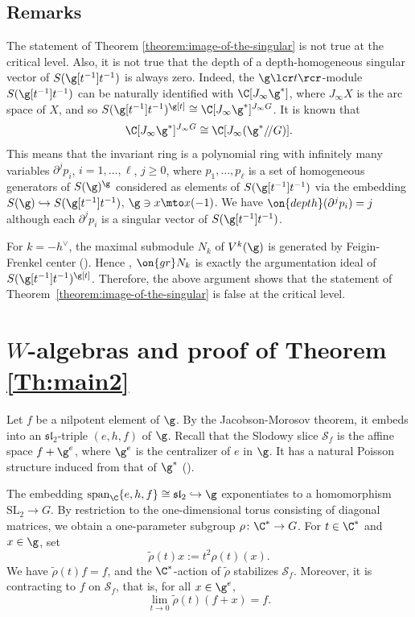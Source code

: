 \subsection{Remarks}\label{subsection:remark}
The statement of Theorem \ref{theorem:image-of-the-singular}
is not true at the critical level.
Also,
it is not true that
the depth of a depth-homogeneous singular vector of $S(\g[t^{-1}]t^{-1})$ is
always zero.
Indeed,
the $\g\lcr t\rcr$-module
$S(\g[t^{-1}]t^{-1})$
can be naturally identified with $\C[J_{\infty}\g^*]$,
where $J_{\infty}X$ is the arc space of $X$,
and so
$S(\g[t^{-1}]t^{-1})^{\g[t]}\cong \C[J_{\infty}\g^*]^{J_{\infty}G}$.
It is known \cite{RaiTau92,BeiDri,EisFre01} that
\begin{equation*}
\C[J_{\infty}\g^*]^{J_{\infty}G}\cong \C[J_{\infty}(\g^*/\!/G)].
\end{equation*}
This means that
the invariant ring is a polynomial ring with infinitely many
variables
$\partial^j p_i$,
$i=1,\dots, \ell$,
$j\geq 0$,
where
$p_1,\dots, p_{\ell}$ is a set of homogeneous generators of
$S(\g)^\g$
considered as elements of
$S(\g[t^{-1}]t^{-1})$ via the embedding
$S(\g)\hookrightarrow S(\g[t^{-1}]t^{-1})$,
$\g\ni x\mto x(-1)$.
We have $\on{depth}(\partial^j p_i)=j$
although
each $\partial^j p_i$ is a singular vector
of $S(\g[t^{-1}]t^{-1})$.

For $k=-h^{\vee}$,
the maximal submodule $N_k$ of $V^k(\g)$
is generated by Feigin-Frenkel center (\cite{FreGai04}).
Hence \cite{FeiFre92,Fre05},
$\on{gr}N_{k}$ is exactly the
argumentation ideal of
$S(\g[t^{-1}]t^{-1})^{\g[t]}$.
Therefore,
the above argument shows that
the statement of Theorem~\ref{theorem:image-of-the-singular}
is false at the critical level.

\section{\texorpdfstring{$W$}{W}-algebras and proof of Theorem \ref{Th:main2}}
\label{sec:W-algebras}
Let $f$ be a nilpotent element of $\g$. By the Jacobson-Morosov theorem,
it embeds into an $\mathfrak{sl}_2$-triple $(e,h,f)$ of $\g$.
Recall that the Slodowy slice $\mathscr{S}_f$ is the affine space $f+\g^{e}$,
where $\g^{e}$ is the centralizer of $e$ in $\g$.
It has a natural Poisson structure induced from that of $\g^*$ (\cite{GanGin02}).

The embedding $\mathrm{span}_\C\{e,h,f\}
\cong \mathfrak{sl}_2 \hookrightarrow \g$
exponentiates to a homomorphism
\hbox{$\mathrm{SL}_2\!\to\!G$}. By restriction to the one-dimensional
torus consisting of diagonal matrices, we obtain
a one-parameter subgroup $\rho \colon \C^* \to G$.
For $t\in\C^*$ and $x\in\g$, set
\begin{equation*} \label{eq:rho}
\tilde{\rho}(t)x := t^{2} \rho(t)(x).
\end{equation*}
We have
$\tilde{\rho}(t)f=f$, and
the $\C^*$-action of $\tilde{\rho}$ stabilizes $\mathscr{S}_f$.
Moreover, it is contracting to $f$ on $\mathscr{S}_f$, that is, for all $x\in\g^{e}$,
\[
\lim_{t\to 0} \tilde{\rho}(t)(f+x)=f.
\]

